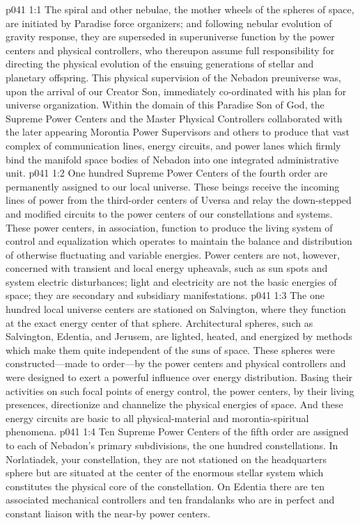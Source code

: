 \vs p041 1:1 The spiral and other nebulae, the mother wheels of the spheres of space, are initiated by Paradise force organizers; and following nebular evolution of gravity response, they are superseded in superuniverse function by the power centers and physical controllers, who thereupon assume full responsibility for directing the physical evolution of the ensuing generations of stellar and planetary offspring. This physical supervision of the Nebadon preuniverse was, upon the arrival of our Creator Son, immediately co\hyp{}ordinated with his plan for universe organization. Within the domain of this Paradise Son of God, the Supreme Power Centers and the Master Physical Controllers collaborated with the later appearing Morontia Power Supervisors and others to produce that vast complex of communication lines, energy circuits, and power lanes which firmly bind the manifold space bodies of Nebadon into one integrated administrative unit.
\vs p041 1:2 One hundred Supreme Power Centers of the fourth order are permanently assigned to our local universe. These beings receive the incoming lines of power from the third\hyp{}order centers of Uversa and relay the down\hyp{}stepped and modified circuits to the power centers of our constellations and systems. These power centers, in association, function to produce the living system of control and equalization which operates to maintain the balance and distribution of otherwise fluctuating and variable energies. Power centers are not, however, concerned with transient and local energy upheavals, such as sun spots and system electric disturbances; light and electricity are not the basic energies of space; they are secondary and subsidiary manifestations.
\vs p041 1:3 The one hundred local universe centers are stationed on Salvington, where they function at the exact energy center of that sphere. Architectural spheres, such as Salvington, Edentia, and Jerusem, are lighted, heated, and energized by methods which make them quite independent of the suns of space. These spheres were constructed---made to order---by the power centers and physical controllers and were designed to exert a powerful influence over energy distribution. Basing their activities on such focal points of energy control, the power centers, by their living presences, directionize and channelize the physical energies of space. And these energy circuits are basic to all physical\hyp{}material and morontia\hyp{}spiritual phenomena.
\vs p041 1:4 Ten Supreme Power Centers of the fifth order are assigned to each of Nebadon’s primary subdivisions, the one hundred constellations. In Norlatiadek, your constellation, they are not stationed on the headquarters sphere but are situated at the center of the enormous stellar system which constitutes the physical core of the constellation. On Edentia there are ten associated mechanical controllers and ten frandalanks who are in perfect and constant liaison with the near\hyp{}by power centers.

